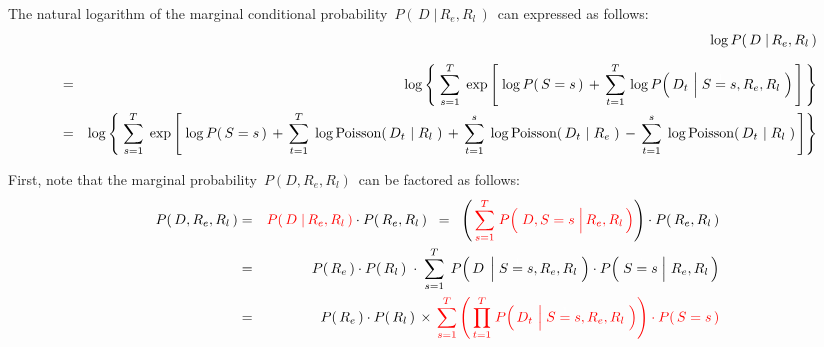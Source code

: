 \vskip 0.5cm
\begin{proposition}
\mbox{}
\vskip 0.2cm
\noindent
The natural logarithm of the marginal conditional probability
\,$P\!\left(\,D\;\vert\,R_{e},R_{l}\,\right)$\,
can expressed as follows:
\begin{eqnarray*}
&&
	\underset{{\color{white}}}{\log P\!\left(\,D \;\vert\, R_{e},R_{l}\,\right)}
\\
&=&
	\log\left\{\;
	\overset{T}{\underset{s=1}{\sum}}\;
	\exp\left[\;
		\log P\!\left(\,S=s\,\right)
		\, + \,
		\overset{T}{\underset{t=1}{\sum}}\,
		\log P\!\left(\,D_{t} \,\left\vert\; S\overset{{\color{white}1}}{=}s,R_{e},R_{l}\right.\,\right)
		\,\right]
	\,\right\}
\\
&=&
	\log\left\{\;
	\overset{T}{\underset{s=1}{\sum}}\;
	\exp\left[\;
			\log P\!\left(\,S=s\,\right)
			\,+\,
			\overset{T}{\underset{t=1}{\sum}}\;
			\log\textnormal{Poisson}\!\left(\,D_{t} \,\left\vert\; R_{l}\right.\,\right)
			\,+\,
			\overset{s}{\underset{t=1}{\sum}}\;
			\log\textnormal{Poisson}\!\left(\,D_{t} \,\left\vert\; R_{e}\right.\,\right)
			\,-\,
			\overset{s}{\underset{t=1}{\sum}}\;
			\log\textnormal{Poisson}\!\left(\,D_{t} \,\left\vert\; R_{l}\right.\,\right)
		\,\right]
	\right\}
\end{eqnarray*}
\end{proposition}
\proof
First, note that the marginal probability \,$P(D,R_{e},R_{l})$\, can be factored as follows:
\begin{eqnarray*}
P\!\left(\,D,R_{e},R_{l}\,\right)
&=&
	{\color{red}P\!\left(\,D \;\vert\, R_{e},R_{l}\,\right)}
	\cdot
	P\!\left(\,R_{e},R_{l}\,\right)
\;\; = \;\;
	\left(\,
		{\color{red}
		\overset{T}{\underset{s=1}{\sum}}\;
		P\!\left(\,\left.D,S\overset{{\color{white}1}}{=}s \;\right\vert R_{e},R_{l}\,\right)}
		\right)
	\cdot
	P\!\left(\,R_{e},R_{l}\,\right)
\\
& = &
	P\!\left(\,R_{e}\,\right)
	\cdot
	P\!\left(\,R_{l}\,\right)
	\;\cdot\;
	\overset{T}{\underset{s=1}{\sum}}\;\,
	P\!\left(\, D \;\left\vert\;S\overset{{\color{white}1}}{=}s,R_{e},R_{l} \right.\,\right)
	\cdot
	P\!\left(\,\left.S\overset{{\color{white}1}}{=}s\;\right\vert\,R_{e},R_{l}\,\right)
\\
& = &
	P\!\left(\,R_{e}\,\right)
	\cdot
	P\!\left(\,R_{l}\,\right)
	\,\times\,
	{\color{red}
	\overset{T}{\underset{s=1}{\sum}}
		\left(\,
			\overset{T}{\underset{t=1}{\prod}}\;
			P\!\left(\,D_{t} \,\left\vert\; S\overset{{\color{white}1}}{=}s,R_{e},R_{l}\right.\,\right)
			\right)
		\cdot
		P\!\left(\,S=s\,\right)
	}
\end{eqnarray*}
